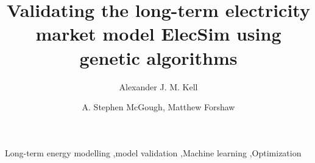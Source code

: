\documentclass[final,3p,times,twocolumn,numbers]{elsarticle}
\begin{document}
\begin{frontmatter}


 \title{Validating the long-term electricity market model ElecSim using genetic algorithms}
 \author{Alexander J. M. Kell}



\author{A. Stephen McGough, Matthew Forshaw}

\address{School of Computing, Newcastle University, Newcastle-upon-Tyne, United Kingdom}

\begin{abstract}

\end{abstract}
%
%

\begin{keyword}
Long-term energy modelling \sep model validation \sep Machine learning \sep Optimization


\end{keyword}

\end{frontmatter}
\end{document}
